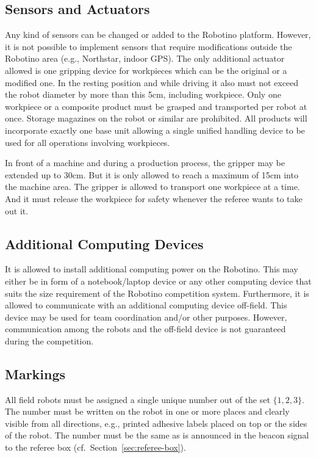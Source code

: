 \documentclass[12pt,twoside]{article}
\newcommand{\Robotino}{Robotino}
\newcommand{\refsec}[1]{Section~\ref{#1}}
\begin{document}
\subsection{Sensors and Actuators}
Any kind of sensors can be changed or added to the Robotino platform.
However, it is not possible to implement sensors that require
modifications outside the Robotino area (e.g., Northstar, indoor GPS).
The only additional actuator allowed is one gripping device for
workpieces which can be the original or a modified one. In the resting
position and while driving it also must not exceed the robot diameter by
more than this 5cm, including workpiece.
Only one workpiece or a composite product must be grasped and
transported per robot at once. Storage magazines on the robot or
similar are prohibited. All products will incorporate exactly one base
unit allowing a single unified handling device to be used for all
operations involving workpieces.

In front of a machine and during a production process, the gripper may
be extended up to 30cm. But it is only allowed to reach a maximum of
15cm into the machine area.
The gripper is allowed to transport one workpiece at a time. And it must
release the workpiece for safety whenever the referee wants to take out it.

\subsection{Additional Computing Devices}
It is allowed to install additional computing power on the
\Robotino. This may either be in form of a notebook/laptop device or
any other computing device that suits the size requirement of the
\Robotino{} competition system. Furthermore, it is allowed to
communicate with an additional computing device off-field. This device
may be used for team coordination and/or other purposes. However,
communication among the robots and the off-field device is not
guaranteed during the competition.

\subsection{Markings}
\label{sec:robot-markings}
All field robots must be assigned a single unique number out of the
set $\{1, 2, 3\}$. The number must be written on the robot in one or
more places and clearly visible from all directions, e.g., printed
adhesive labels placed on top or the sides of the robot. The number
must be the same as is announced in the beacon signal to the referee
box (cf.~\refsec{sec:referee-box}).
\end{document}

